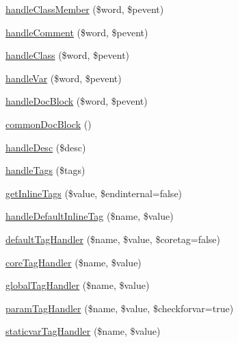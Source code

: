 \begin{DoxyCompactItemize}
\item 
\hyperlink{classphp_documentor___highlight_parser_a6fda33f6258452df7d8cc06d9a44d8e4}{handle\-Class\-Member} (\$word, \$pevent)
\item 
\hyperlink{classphp_documentor___highlight_parser_a20f0c871394d25d98cb94346b92b52ad}{handle\-Comment} (\$word, \$pevent)
\item 
\hyperlink{classphp_documentor___highlight_parser_a3a3555968696bdaf66a627ebedc5e4aa}{handle\-Class} (\$word, \$pevent)
\item 
\hyperlink{classphp_documentor___highlight_parser_a5e19ceeed570fa556cfa546f730a093d}{handle\-Var} (\$word, \$pevent)
\item 
\hyperlink{classphp_documentor___highlight_parser_a38bc1e0a6586b0f2aac2cd0968db0bd3}{handle\-Doc\-Block} (\$word, \$pevent)
\item 
\hyperlink{classphp_documentor___highlight_parser_a6b80e02e8e975970e8c2bcae7938d152}{common\-Doc\-Block} ()
\item 
\hyperlink{classphp_documentor___highlight_parser_af7c8dd1dbec9f5a5ab7273e2ac9dac2f}{handle\-Desc} (\$desc)
\item 
\hyperlink{classphp_documentor___highlight_parser_abb952ee2c4bdbf826958dafe271f6227}{handle\-Tags} (\$tags)
\item 
\hyperlink{classphp_documentor___highlight_parser_aab47e31cb0248e99f46b9d534973af21}{get\-Inline\-Tags} (\$value, \$endinternal=false)
\item 
\hyperlink{classphp_documentor___highlight_parser_a73b963ce376aca18fd8dbebecad18d43}{handle\-Default\-Inline\-Tag} (\$name, \$value)
\item 
\hyperlink{classphp_documentor___highlight_parser_ad1c543277e68e7f8b4730f53748fad7b}{default\-Tag\-Handler} (\$name, \$value, \$coretag=false)
\item 
\hyperlink{classphp_documentor___highlight_parser_ac3ab9cb363f1efefcb852389328138c5}{core\-Tag\-Handler} (\$name, \$value)
\item 
\hyperlink{classphp_documentor___highlight_parser_a57e7f87881d9380b76f5cf7744dcc23f}{global\-Tag\-Handler} (\$name, \$value)
\item 
\hyperlink{classphp_documentor___highlight_parser_a18ae3c5d37ca12fd56051e21288881fe}{param\-Tag\-Handler} (\$name, \$value, \$checkforvar=true)
\item 
\hyperlink{classphp_documentor___highlight_parser_a7d4cd9c769f4ee284af7df08a8fc0beb}{staticvar\-Tag\-Handler} (\$name, \$value)
\item 

\end{DoxyCompactItemize}
